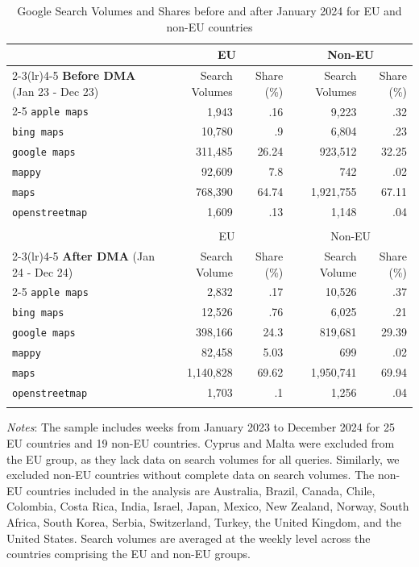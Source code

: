 \documentclass[11pt]{article}
\begin{document}
	\clearpage
	
	\begin{table}
		\centering
		\def\sym#1{\ifmmode^{#1}\else\(^{#1}\)\fi}
		\caption{\label{tab:sum_stat} Google Search Volumes and Shares before and after January 2024 for EU and non-EU countries} 
		\begin{threeparttable}
			\begin{tabular}{lrrrr}
				\toprule \noalign{\smallskip} 
				& \multicolumn{2}{c}{EU} & \multicolumn{2}{c}{Non-EU}  \\ \cmidrule(lr){2-3}\cmidrule(lr){4-5}
				\textbf{Before DMA }\;(Jan 23 - Dec 23)		& Search Volumes & Share (\%) & Search Volumes & Share (\%)  \\ \cmidrule(lr){2-5}
                \texttt{apple maps}&1,943&.16&9,223&.32 \tabularnewline
                \texttt{bing maps}&10,780&.9&6,804&.23 \tabularnewline
                \texttt{google maps}&311,485&26.24&923,512&32.25 \tabularnewline
                \texttt{mappy}&92,609&7.8&742&.02 \tabularnewline
                \texttt{maps}&768,390&64.74&1,921,755&67.11 \tabularnewline
                \texttt{openstreetmap}&1,609&.13&1,148&.04 \tabularnewline \vspace{-10pt} \\ 
				\toprule 
				& \multicolumn{2}{c}{EU} & \multicolumn{2}{c}{Non-EU}  \\ \cmidrule(lr){2-3}\cmidrule(lr){4-5}
				\textbf{After DMA }\;(Jan 24 - Dec 24)		& Search Volume & Share (\%) & Search Volume & Share (\%)  \\ \cmidrule(lr){2-5}
				\texttt{apple maps}&2,832&.17&10,526&.37 \tabularnewline
				\texttt{bing maps}&12,526&.76&6,025&.21 \tabularnewline
				\texttt{google maps}&398,166&24.3&819,681&29.39 \tabularnewline
				\texttt{mappy}&82,458&5.03&699&.02 \tabularnewline
				\texttt{maps}&1,140,828&69.62&1,950,741&69.94 \tabularnewline
				\texttt{openstreetmap}&1,703&.1&1,256&.04 \tabularnewline \vspace{-10pt}\\
				\bottomrule 
			\end{tabular}
			
			\begin{tablenotes}
				\item \footnotesize \emph{Notes}: The sample includes weeks from January 2023 to December 2024 for 25 EU countries and 19 non-EU countries. Cyprus and Malta were excluded from the EU group, as they lack data on search volumes for all queries. Similarly, we excluded non-EU countries without complete data on search volumes. The non-EU countries included in the analysis are Australia, Brazil, Canada, Chile, Colombia, Costa Rica, India, Israel, Japan, Mexico, New Zealand, Norway, South Africa, South Korea, Serbia, Switzerland, Turkey, the United Kingdom, and the United States. Search volumes are averaged at the weekly level across the countries comprising the EU and non-EU groups. 
			\end{tablenotes}
		\end{threeparttable}
	\end{table}
	
\end{document}
